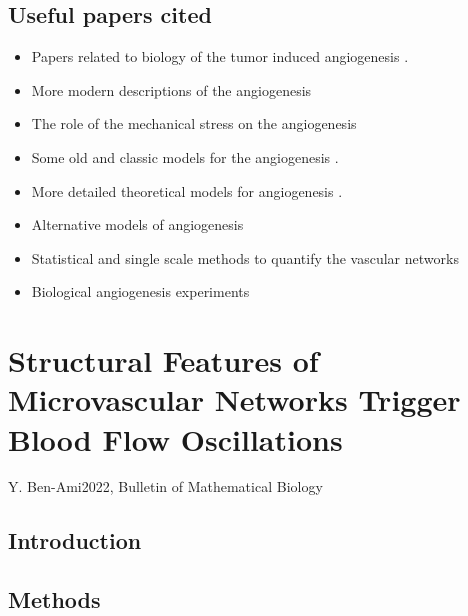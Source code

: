 \subsection{Useful papers cited}
\begin{itemize}
	\item Papers related to biology of the tumor induced angiogenesis \cite{Gupta2003,Folkman1971}.
	\item More modern descriptions of the angiogenesis \cite{Lugano2020,Saman2020}
	\item The role of the mechanical stress on the angiogenesis \cite{Li2005,Li2002,Vavourakis2017}
	\item Some old and classic models for the angiogenesis \cite{Anderson1998,Balding1985,Byrne1995,Stokes1991}.
	\item More detailed theoretical models for angiogenesis \cite{Byrne2010,Hadjicharalambous2021,Metzcar2019,Scianna2013}.
	\item Alternative models of angiogenesis \cite{Vilanova2017,Stepanova2021,Perfahl2017,Grogan2017,Vavourakis2017,Cai2017,Sefidgar2015}
	\item Statistical and single scale methods to quantify the vascular networks \cite{Perfahl2017,Folarin2010,Kannan2018,Konerding1999,Konerding2001}
	\item Biological angiogenesis experiments \cite{Bauer2007}
\end{itemize}




\section{Structural Features of Microvascular Networks Trigger Blood Flow Oscillations}{Y. Ben-Ami}{2022, Bulletin of Mathematical Biology}

\subsection{Introduction}


\subsection{Methods}



